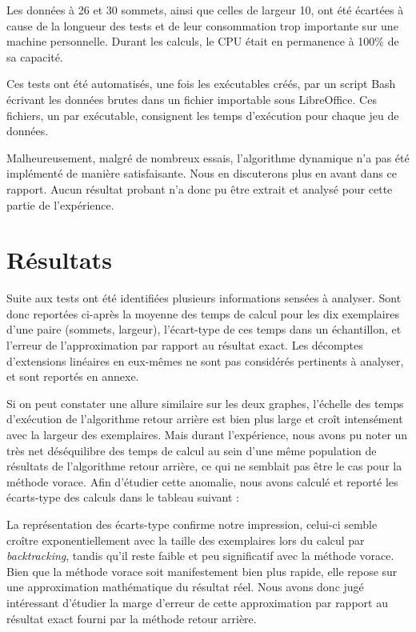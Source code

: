 \documentclass[10pt,a4paper]{article}
\begin{document}
Les données à 26 et 30 sommets, ainsi que celles de largeur 10, ont été écartées à cause de la longueur des tests et de leur consommation trop importante sur une machine personnelle. Durant les calculs, le CPU était en permanence à 100\% de sa capacité.

Ces tests ont été automatisés, une fois les exécutables créés, par un script Bash écrivant les données brutes dans un fichier importable sous LibreOffice. Ces fichiers, un par exécutable, consignent les temps d'exécution pour chaque jeu de données.

Malheureusement, malgré de nombreux essais, l'algorithme dynamique n'a pas été implémenté de manière satisfaisante. Nous en discuterons plus en avant dans ce rapport. Aucun résultat probant n'a donc pu être extrait et analysé pour cette partie de l'expérience.

\section{Résultats}

Suite aux tests ont été identifiées plusieurs informations sensées à analyser. Sont donc reportées ci-après la moyenne des temps de calcul pour les dix exemplaires d'une paire (sommets, largeur), l'écart-type de ces temps dans un échantillon, et l'erreur de l'approximation par rapport au résultat exact. Les décomptes d'extensions linéaires en eux-mêmes ne sont pas considérés pertinents à analyser, et sont reportés en annexe.



Si on peut constater une allure similaire sur les deux graphes, l'échelle des temps d'exécution de l'algorithme retour arrière est bien plus large et croît intensément avec la largeur des exemplaires. Mais durant l'expérience, nous avons pu noter un très net déséquilibre des temps de calcul au sein d'une même population de résultats de l'algorithme retour arrière, ce qui ne semblait pas être le cas pour la méthode vorace. Afin d'étudier cette anomalie, nous avons calculé et reporté les écarts-type des calculs dans le tableau suivant :



La représentation des écarts-type confirme notre impression, celui-ci semble croître exponentiellement avec la taille des exemplaires lors du calcul par \textit{backtracking}, tandis qu'il reste faible et peu significatif avec la méthode vorace.
Bien que la méthode vorace soit manifestement bien plus rapide, elle repose sur une approximation mathématique du résultat réel. Nous avons donc jugé intéressant d'étudier la marge d'erreur de cette approximation par rapport au résultat exact fourni par la méthode retour arrière.
\end{document}
